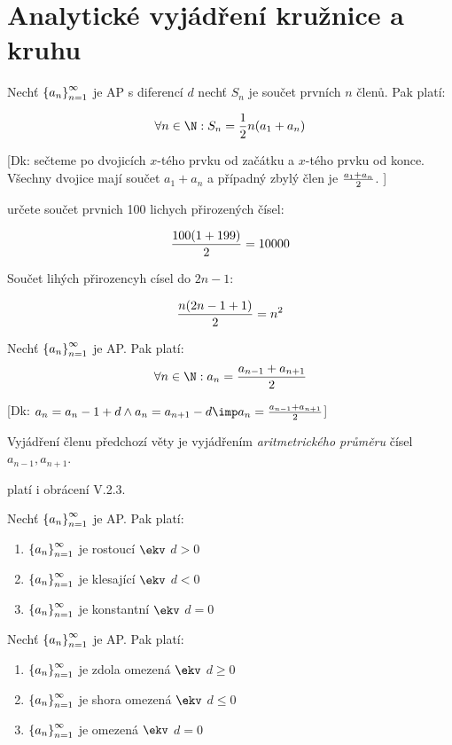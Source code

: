 
\BeginDoc{}
\section{Analytické vyjádření kružnice a kruhu}
\V {\huge\dots}
\V Nechť $\left\{{a_n}\right\}_{n=1}^\infty$ je AP s diferencí $d$ nechť $S_n$ je součet prvních $n$ členů. Pak platí:

$$\forall n\in\N: S_n = \f 12 n (a_1+a_n)$$

[Dk: sečteme po dvojicích $x$-tého prvku od začátku a $x$-tého prvku od konce. Všechny dvojice mají součet $a_1+a_n$ a případný zbylý člen je $\frac{a_1+a_n}2$. ]

\Pr určete součet prvnich 100 lichych přirozených čísel:

$$\f{100\*(1+199)}2 = 10000$$

Součet lihých přirozencyh císel do $2n-1$:

$$\frac {n(2n-1+1)}2 = n^2$$

\V Nechť $\left\{{a_n}\right\}_{n=1}^\infty$ je AP. Pak platí:
$$\forall n\in\N: a_n = \f{a_{n-1}+a_{n+1}}2$$

[Dk: $a_n = a_n-1+d \land a_n=a_{n+1}-d \imp a_n = \f{a_{n-1}+a_{n+1}}2$]

\Pozenum Vyjádření členu předchozí věty je vyjádřením \emph{aritmetrického průměru} čísel $a_{n-1},a_{n+1}$.
\item platí i obrácení V.2.3.

\V Nechť $\left\{{a_n}\right\}_{n=1}^\infty$ je AP. Pak platí:
\begin{enumerate}
\item $\left\{{a_n}\right\}_{n=1}^\infty$ je rostoucí $\ekv$ $d>0$
\item $\left\{{a_n}\right\}_{n=1}^\infty$ je klesající $\ekv$ $d<0$
\item $\left\{{a_n}\right\}_{n=1}^\infty$ je konstantní $\ekv$ $d=0$
\end{enumerate}

\V Nechť $\left\{{a_n}\right\}_{n=1}^\infty$ je AP. Pak platí:
\begin{enumerate}
\item $\left\{{a_n}\right\}_{n=1}^\infty$ je zdola omezená $\ekv$ $d\ge 0$
\item $\left\{{a_n}\right\}_{n=1}^\infty$ je shora omezená $\ekv$ $d\le 0$
\item $\left\{{a_n}\right\}_{n=1}^\infty$ je omezená $\ekv$ $d=0$
\end{enumerate}

\EndDoc
